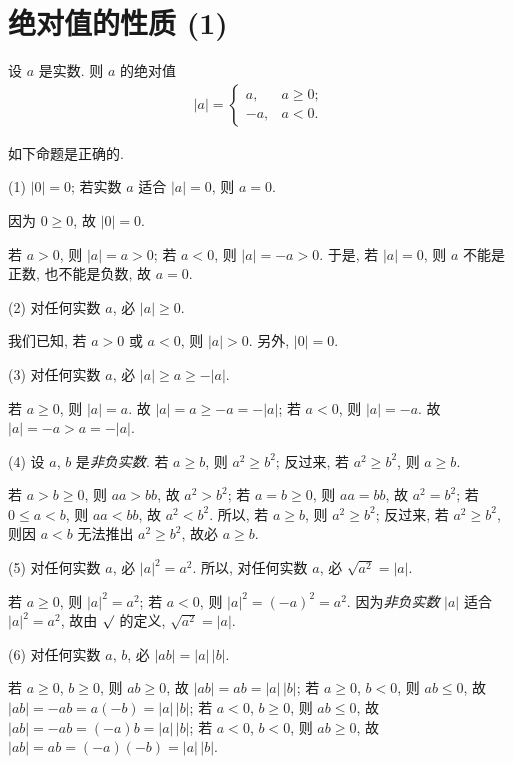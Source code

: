 \section{绝对值的性质 (1)}

设 \(a\) 是实数.
则 \(a\) 的绝对值
\begin{align*}
    |a| = \begin{cases}
              a,  & a \geq 0; \\
              -a, & a < 0.
          \end{cases}
\end{align*}

如下命题是正确的.

(1)
\(|0| = 0\);
若实数 \(a\) 适合 \(|a| = 0\), 则 \(a = 0\).

因为 \(0 \geq 0\),
故 \(|0| = 0\).

若 \(a > 0\), 则 \(|a| = a > 0\);
若 \(a < 0\), 则 \(|a| = -a > 0\).
于是, 若 \(|a| = 0\), 则 \(a\) 不能是正数,
也不能是负数, 故 \(a = 0\).

(2)
对任何实数 \(a\), 必 \(|a| \geq 0\).

我们已知, 若 \(a > 0\) 或 \(a < 0\), 则 \(|a| > 0\).
另外, \(|0| = 0\).

(3)
对任何实数 \(a\), 必 \(|a| \geq a \geq -|a|\).

若 \(a \geq 0\), 则 \(|a| = a\).
故 \(|a| = a \geq -a = -|a|\);
若 \(a < 0\), 则 \(|a| = -a\).
故 \(|a| = -a > a = -|a|\).

(4)
设 \(a\), \(b\) 是\emph{非负实数}.
若 \(a \geq b\), 则 \(a^2 \geq b^2\);
反过来, 若 \(a^2 \geq b^2\), 则 \(a \geq b\).

若 \(a > b \geq 0\), 则 \(a a > b b\), 故 \(a^2 > b^2\);
若 \(a = b \geq 0\), 则 \(a a = b b\), 故 \(a^2 = b^2\);
若 \(0 \leq a < b\), 则 \(a a < b b\), 故 \(a^2 < b^2\).
所以, 若 \(a \geq b\), 则 \(a^2 \geq b^2\);
反过来, 若 \(a^2 \geq b^2\), 则因 \(a < b\)
无法推出 \(a^2 \geq b^2\), 故必 \(a \geq b\).

(5)
对任何实数 \(a\), 必 \(|a|^2 = a^2\).
所以, 对任何实数 \(a\), 必 \(\sqrt{a^2} = |a|\).

若 \(a \geq 0\), 则 \(|a|^2 = a^2\);
若 \(a < 0\), 则 \(|a|^2 = (-a)^2 = a^2\).
因为\emph{非负实数} \(|a|\) 适合 \(|a|^2 = a^2\),
故由 \(\surd\) 的定义, \(\sqrt{a^2} = |a|\).

(6)
对任何实数 \(a\), \(b\), 必 \(|ab| = |a|\, |b|\).

若 \(a \geq 0\), \(b \geq 0\),
则 \(ab \geq 0\),
故 \(|ab| = ab = |a|\, |b|\);
若 \(a \geq 0\), \(b < 0\),
则 \(ab \leq 0\),
故 \(|ab| = -ab = a(-b) =|a|\, |b|\);
若 \(a < 0\), \(b \geq 0\),
则 \(ab \leq 0\),
故 \(|ab| = -ab = (-a)b = |a|\, |b|\);
若 \(a < 0\), \(b < 0\),
则 \(ab \geq 0\),
故 \(|ab| = ab = (-a)(-b) = |a|\, |b|\).

